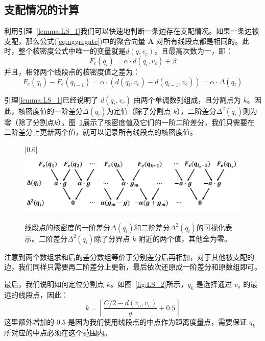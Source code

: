 \subsection{支配情况的计算}

利用引理~\ref{lemma:LS_1}我们可以快速地判断一条边存在支配情况。如果一条边被支配，那么公式(\ref{eq:aggregate})中的聚合向量 $\mathbf{A}$ 对所有线段点都是相同的。此时，整个核密度公式中唯一的变量就是$d(q, v_c)$，且最高次数为一，即：
\begin{equation*}
    F_e(q_i) = \alpha \cdot d(q_i, v_c) + \beta
\end{equation*}
并且，相邻两个线段点的核密度值之差为：
\begin{equation*}
    F_e(q_i) - F_e(q_{i-1}) = \alpha \cdot (d(q_i, v_c) - d(q_{i-1}, v_c)) = \alpha \cdot \Delta(q_i)
\end{equation*}


引理\ref{lemma:LS_1}已经说明了 $d(q_i, v_c)$ 由两个单调数列组成，且分割点为 $k$。因此，核密度值的一阶差分$\Delta(q_i)$为定值（除了分割点 $k$），二阶差分$\Delta^2(q_i)$则为零（除了分割点$k$）。图~\ref{fig:LS_3}展示了核密度值及它们的一阶二阶差分，我们只需要在二阶差分上更新两个值，就可以记录所有线段点的核密度值。

\begin{figure}[h!]\centering
    \scalebox{0.6}[0.6]{\includegraphics{./figures/LS_3.pdf}}
    \caption{线段点的核密度的一阶差分$\Delta(q_i)$和二阶差分$\Delta^2(q_i)$的可视化表示。二阶差分$\Delta^2(q_i)$除了分界点 $k$ 附近的两个值，其他全为零。}
    \label{fig:LS_3}
\end{figure}

注意到两个数组求和后的差分数组等价于分别差分后再相加，对于其他被支配的边，我们同样只需要再二阶差分上更新，最后依次还原成一阶差分和原数组即可。

最后，我们说明如何定位分割点 $k$。如图~\ref{fig:LS_2}所示，$q_k$ 是选择通过 $v_a$ 的最远的线段点，因此：
\begin{equation*}
    k = \left\lceil \frac{C/2 - d(v_a, v_c)}{g} + 0.5 \right\rceil
\end{equation*}
这里额外增加的 $0.5$ 是因为我们使用线段点的中点作为距离度量点，需要保证 $q_k$ 所对应的中点必须在这个范围内。

